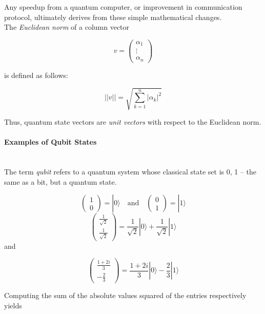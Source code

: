 \documentclass[svgnames]{article}     %
\begin{document}
Any speedup from a quantum computer, or improvement in communication protocol,
ultimately derives from these simple mathematical changes. \\

The \textit{Euclidean norm} of a column  vector 

\[
v = \begin{pmatrix}
  \alpha_1 \\ \vdots \\ \alpha_n
\end{pmatrix} 
\] \vspace{5px}

is defined as follows: 

\[
  || v || = \sqrt{\sum_{k=1}^n |\alpha_k|^2}
\] \vspace{5px}

Thus, quantum state vectors are  \textit{unit vectors} with respect to the
Euclidean norm. 

\paragraph{Examples of Qubit States} \mbox{} \\

The term \textit{qubit} refers to a quantum system whose classical state set is
{0, 1} -- the same as a bit, but a quantum state. 

\[
\begin{pmatrix}
  1 \\ 0 
\end{pmatrix} = |0\rangle \quad \text{and} \quad \begin{pmatrix}
  0 \\ 1
\end{pmatrix} = |1\rangle
\] \vspace{5px}
\[
\begin{pmatrix}
  \frac{1}{\sqrt{2}} \\[4px] \frac{1}{\sqrt{2}}
\end{pmatrix} = \frac{1}{\sqrt{2}}|0\rangle + \frac{1}{\sqrt{2}}|1\rangle
\]\vspace{5px}
and 

\[
\begin{pmatrix}
  \frac{1+2i}{3} \\[4px] -\frac{2}{3} 
\end{pmatrix} = \frac{1+2i}{3}|0\rangle - \frac{2}{3}|1\rangle
\] \vspace{5px}

Computing the sum of the absolute values squared of the entries respectively
yields
\end{document}
